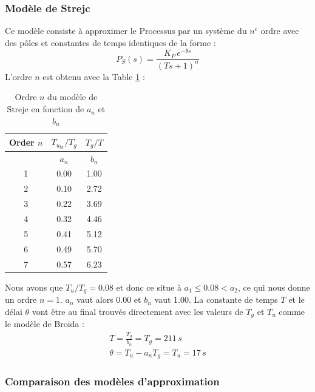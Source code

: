 \subsubsection{Modèle de Strejc}
Ce modèle consiste à approximer le Processus par un système du $n^{e}$ ordre avec des pôles et constantes de temps identiques de la forme :
\begin{equation*}
    P_S(s) = \frac{K_P\,e^{-\theta s}}{(T s + 1)^n}
\end{equation*}
L'ordre $n$ est obtenu avec la Table \ref{tab:Strejc_order} :
\begin{table}[H]
    \centering
    \begin{tabular}{|c|c|c|} 
        \hline
        Order $n$ & $T_{u_{th}}/T_g$ & $T_g/T$ \\
        \hline
         & $a_n$ & $b_n$ \\
        \hline
        1 & 0.00 & 1.00 \\
        \hline
        2 & 0.10 & 2.72 \\
        \hline
        3 & 0.22 & 3.69 \\
        \hline
        4 & 0.32 & 4.46 \\
        \hline
        5 & 0.41 & 5.12 \\
        \hline
        6 & 0.49 & 5.70 \\
        \hline
        7 & 0.57 & 6.23 \\
        \hline
    \end{tabular}
    \caption{Ordre $n$ du modèle de Strejc en fonction de $a_n$ et $b_n$}
    \label{tab:Strejc_order}
\end{table}
Nous avons que $T_u/T_g = 0.08$ et donc ce situe à $a_1 \leq 0.08 < a_2$, ce qui nous donne un ordre $n = 1$. $a_n$ vaut alors 0.00 et $b_n$ vaut 1.00.
La constante de temps $T$ et le délai $\theta$ vont être au final trouvés directement avec les valeurs de $T_g$ et $T_u$ comme le modèle de Broida :
\begin{align*}
    T = \frac{T_g}{b_n} = T_g = 211\,s\\
    \theta = T_u - a_n T_g = T_u = 17\,s
\end{align*}

\subsubsection{Comparaison des modèles d'approximation}

